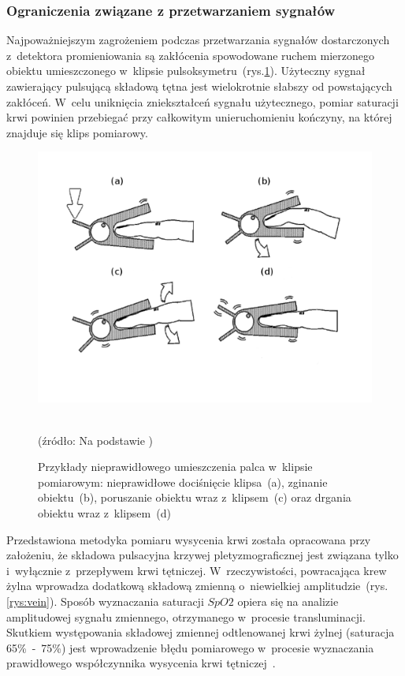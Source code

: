 \subsubsection{Ograniczenia związane z przetwarzaniem sygnałów}
\label{subsubsec:fizj}

Najpoważniejszym zagrożeniem podczas przetwarzania sygnałów dostarczonych z~detektora promieniowania są zakłócenia spowodowane ruchem mierzonego obiektu umieszczonego
w~klipsie pulsoksymetru~(rys.\ref{rys:noise}). Użyteczny sygnał zawierający pulsującą składową tętna jest wielokrotnie słabszy od powstających zakłóceń. W~celu uniknięcia
zniekształceń sygnału użytecznego, pomiar saturacji krwi powinien przebiegać przy całkowitym unieruchomieniu kończyny, na której znajduje się klips pomiarowy.

\begin{figure}[ht]
\centerline{\includegraphics[scale = 0.38]{graphic/noise}}
	\caption{Przykłady nieprawidłowego umieszczenia palca w~klipsie pomiarowym: nieprawidłowe dociśnięcie klipsa~(a), zginanie obiektu~(b), poruszanie obiektu wraz z~klipsem~(c)
		oraz drgania obiektu wraz z~klipsem~(d)}
	\label{rys:noise}
	~\\
	(źródło: Na podstawie \cite{Dwyer:2008})
\end{figure}

Przedstawiona metodyka pomiaru wysycenia krwi została opracowana przy założeniu, że składowa pulsacyjna krzywej pletyzmograficznej jest związana tylko i~wyłącznie z~przepływem krwi tętniczej.
W~rzeczywistości, powracająca krew żylna wprowadza dodatkową składową zmienną o~niewielkiej amplitudzie~(rys.\ref{rys:vein}). Sposób wyznaczania saturacji $SpO2$ opiera się na analizie amplitudowej 
sygnału zmiennego, otrzymanego w~procesie transluminacji. Skutkiem występowania składowej zmiennej odtlenowanej krwi żylnej (saturacja 65\%~-~75\%) jest wprowadzenie błędu pomiarowego w~procesie 
wyznaczania prawidłowego współczynnika wysycenia krwi tętniczej~\cite{Fuzzy:2011}. 

